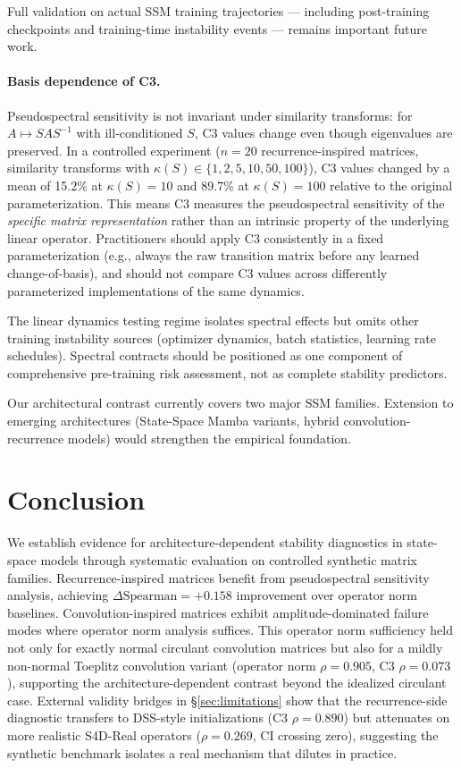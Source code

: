 \documentclass[twoside]{article}
\begin{document}
Full validation on actual SSM training trajectories — including post-training checkpoints and training-time instability events — remains important future work.

\paragraph{Basis dependence of C3.}
Pseudospectral sensitivity is not invariant under similarity transforms: for $A \mapsto SAS^{-1}$ with ill-conditioned $S$, C3 values change even though eigenvalues are preserved. In a controlled experiment ($n=20$ recurrence-inspired matrices, similarity transforms with $\kappa(S) \in \{1, 2, 5, 10, 50, 100\}$), C3 values changed by a mean of 15.2\% at $\kappa(S)=10$ and 89.7\% at $\kappa(S)=100$ relative to the original parameterization. This means C3 measures the pseudospectral sensitivity of the \emph{specific matrix representation} rather than an intrinsic property of the underlying linear operator. Practitioners should apply C3 consistently in a fixed parameterization (e.g., always the raw transition matrix before any learned change-of-basis), and should not compare C3 values across differently parameterized implementations of the same dynamics.

The linear dynamics testing regime isolates spectral effects but omits other training instability sources (optimizer dynamics, batch statistics, learning rate schedules). Spectral contracts should be positioned as one component of comprehensive pre-training risk assessment, not as complete stability predictors.

Our architectural contrast currently covers two major SSM families. Extension to emerging architectures (State-Space Mamba variants, hybrid convolution-recurrence models) would strengthen the empirical foundation.

\section{Conclusion}

We establish evidence for architecture-dependent stability diagnostics in state-space models through systematic evaluation on controlled synthetic matrix families. Recurrence-inspired matrices benefit from pseudospectral sensitivity analysis, achieving $\Delta\text{Spearman}=+0.158$ improvement over operator norm baselines. Convolution-inspired matrices exhibit amplitude-dominated failure modes where operator norm analysis suffices. This operator norm sufficiency held not only for exactly normal circulant convolution matrices but also for a mildly non-normal Toeplitz convolution variant (operator norm $\rho = 0.905$, C3 $\rho = 0.073$), supporting the architecture-dependent contrast beyond the idealized circulant case. External validity bridges in \S\ref{sec:limitations} show that the recurrence-side diagnostic transfers to DSS-style initializations (C3 $\rho = 0.890$) but attenuates on more realistic S4D-Real operators ($\rho = 0.269$, CI crossing zero), suggesting the synthetic benchmark isolates a real mechanism that dilutes in practice.
\end{document}
